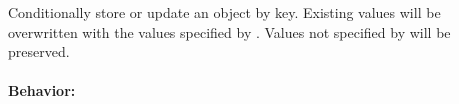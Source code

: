 Conditionally store or update an object by key.  Existing values will be
overwritten with the values specified by .  Values not specified by
 will be preserved.

\paragraph{Behavior:}
\begin{itemize}[noitemsep]


\end{itemize}
